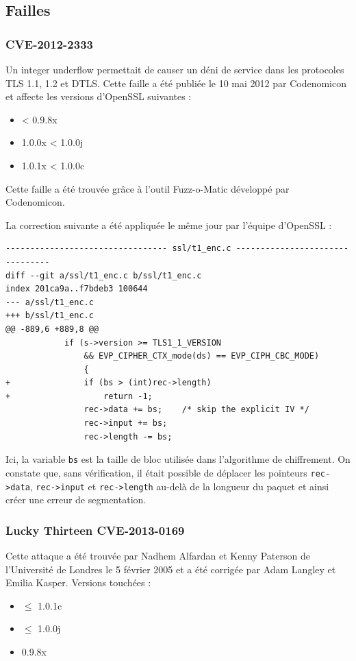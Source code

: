\documentclass[a4paper,11pt,french]{article}
\begin{document}
\subsection{Failles}
\subsubsection{\label{CVE-2012-2333}CVE-2012-2333}

Un integer underflow permettait de causer un déni de service dans les protocoles TLS 1.1, 1.2 et DTLS. Cette faille a été publiée le 10 mai 2012 par Codenomicon et affecte les versions d'OpenSSL suivantes :
\begin{itemize}
\item < 0.9.8x
\item 1.0.0x < 1.0.0j
\item 1.0.1x < 1.0.0c
\end{itemize}

Cette faille a été trouvée grâce à l'outil Fuzz-o-Matic développé par Codenomicon.

La correction suivante a été appliquée le même jour par l'équipe d'OpenSSL :
\begin{Verbatim}
--------------------------------- ssl/t1_enc.c --------------------------------
diff --git a/ssl/t1_enc.c b/ssl/t1_enc.c
index 201ca9a..f7bdeb3 100644
--- a/ssl/t1_enc.c
+++ b/ssl/t1_enc.c
@@ -889,6 +889,8 @@
            if (s->version >= TLS1_1_VERSION
                && EVP_CIPHER_CTX_mode(ds) == EVP_CIPH_CBC_MODE)
                {
+               if (bs > (int)rec->length)
+                   return -1;
                rec->data += bs;    /* skip the explicit IV */
                rec->input += bs;
                rec->length -= bs;
\end{Verbatim}

Ici, la variable \verb+bs+ est la taille de bloc utilisée dans l'algorithme de chiffrement.
On constate que, sans vérification, il était possible de déplacer les pointeurs \verb+rec->data+, \verb+rec->input+ et \verb+rec->length+  au-delà de la longueur du paquet et ainsi créer une erreur de segmentation.

\subsubsection{Lucky Thirteen CVE-2013-0169}

Cette attaque a été trouvée par Nadhem Alfardan et Kenny Paterson de l'Université de Londres le 5 février 2005 et a été corrigée par Adam Langley et Emilia Kasper. Versions touchées :
\begin{itemize}
\item $\le$ 1.0.1c 
\item $\le$ 1.0.0j 
\item 0.9.8x
\end{itemize}
\end{document}
